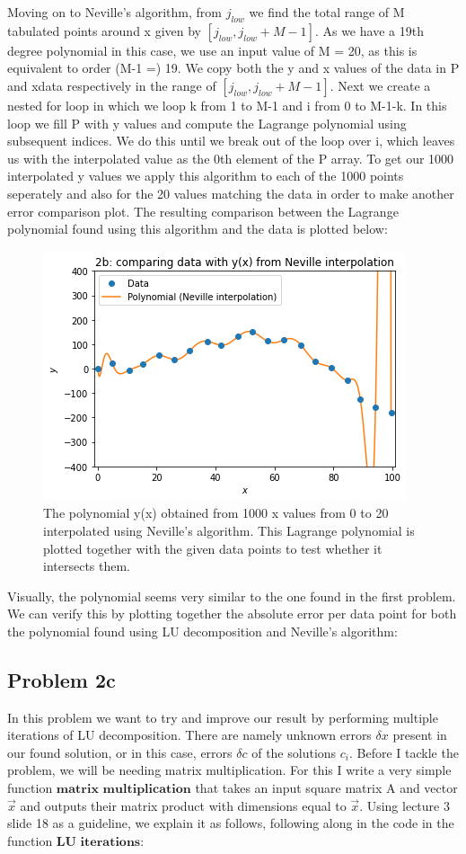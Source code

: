 Moving on to Neville's algorithm, from $j_{low}$ we find the total range of M tabulated points around x given by $[j_{low},j_{low}+M-1]$. As we have a 19th degree polynomial in this case, we use an input value of M = 20, as this is equivalent to order (M-1 =) 19. We copy both the y and x values of the data in P and xdata respectively in the range of $[j_{low},j_{low}+M-1]$. Next we create a nested for loop in which we loop k from 1 to M-1 and i from 0 to M-1-k. In this loop we fill P with y values and compute the Lagrange polynomial using subsequent indices. We do this until we break out of the loop over i, which leaves us with the interpolated value as the 0th element of the P array. To get our 1000 interpolated y values we apply this algorithm to each of the 1000 points seperately and also for the 20 values matching the data in order to make another error comparison plot. The resulting comparison between the Lagrange polynomial found using this algorithm and the data is plotted below:

\begin{figure}[h!]
  \centering
  \includegraphics[width=0.6\linewidth]{problem2b1.png}
  \caption{The polynomial y(x) obtained from 1000 x values from 0 to 20 interpolated using Neville's algorithm. This Lagrange polynomial is plotted together with the given data points to test whether it intersects them.}
  \label{fig:fig2}
\end{figure}

Visually, the polynomial seems very similar to the one found in the first problem. We can verify this by plotting together the absolute error per data point for both the polynomial found using LU decomposition and Neville's algorithm: 

\subsection{Problem 2c}

In this problem we want to try and improve our result by performing multiple iterations of LU decomposition. There are namely unknown errors $\delta x$ present in our found solution, or in this case, errors $\delta c$ of the solutions $c_i$. Before I tackle the problem, we will be needing matrix multiplication. For this I write a very simple function $\textbf{matrix multiplication}$ that takes an input square matrix A and vector $\vec{x}$ and outputs their matrix product with dimensions equal to $\vec{x}$. Using lecture 3 slide 18 as a guideline, we explain it as follows, following along in the code in the function $\textbf{LU iterations}$:\\

